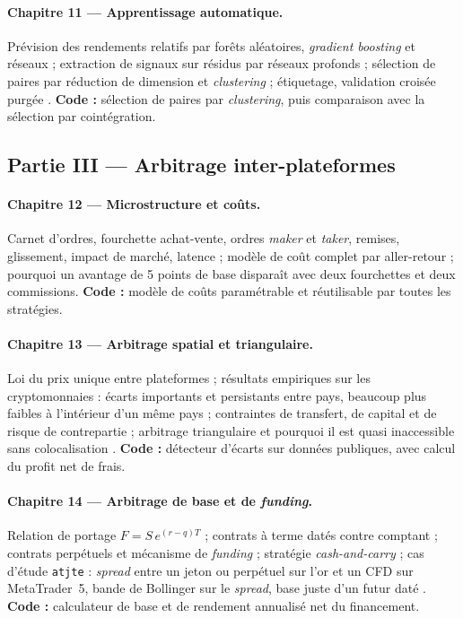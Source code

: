 \paragraph{Chapitre 11 — Apprentissage automatique.}
Prévision des rendements relatifs par forêts aléatoires, \emph{gradient boosting} et réseaux \citep{krauss2017ml} ; extraction de signaux sur résidus par réseaux profonds \citep{guijarro2021} ; sélection de paires par réduction de dimension et \emph{clustering} \citep{sarmento2020} ; étiquetage, validation croisée purgée \citep{lopezdeprado2018}. \textbf{Code :} sélection de paires par \emph{clustering}, puis comparaison avec la sélection par cointégration.

\subsection{Partie III — Arbitrage inter-plateformes}

\paragraph{Chapitre 12 — Microstructure et coûts.}
Carnet d'ordres, fourchette achat-vente, ordres \emph{maker} et \emph{taker}, remises, glissement, impact de marché, latence \citep{harris2003} ; modèle de coût complet par aller-retour ; pourquoi un avantage de 5 points de base disparaît avec deux fourchettes et deux commissions. \textbf{Code :} modèle de coûts paramétrable et réutilisable par toutes les stratégies.

\paragraph{Chapitre 13 — Arbitrage spatial et triangulaire.}
Loi du prix unique entre plateformes ; résultats empiriques sur les cryptomonnaies \citep{makarov2020} : écarts importants et persistants entre pays, beaucoup plus faibles à l'intérieur d'un même pays ; contraintes de transfert, de capital et de risque de contrepartie ; arbitrage triangulaire et pourquoi il est quasi inaccessible sans colocalisation \citep{budish2015}. \textbf{Code :} détecteur d'écarts sur données publiques, avec calcul du profit net de frais.

\paragraph{Chapitre 14 — Arbitrage de base et de \emph{funding}.}
Relation de portage $F = S\,e^{(r-q)T}$ \citep{hull2022} ; contrats à terme datés contre comptant ; contrats perpétuels et mécanisme de \emph{funding} ; stratégie \emph{cash-and-carry} ; cas d'étude \texttt{atjte} : \emph{spread} entre un jeton ou perpétuel sur l'or et un CFD sur MetaTrader~5, bande de Bollinger sur le \emph{spread}, base \og juste\fg{} d'un futur daté \citep{atjte}. \textbf{Code :} calculateur de base et de rendement annualisé net du financement.

